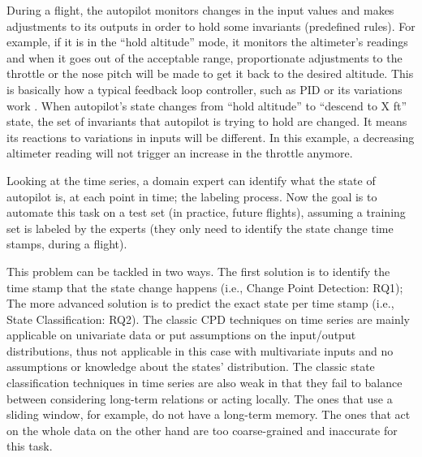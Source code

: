 

During a flight, the autopilot monitors changes in the input values and makes adjustments to its outputs in order to hold some invariants (predefined rules). 
For example, if it is in the ``hold altitude'' mode, it monitors the altimeter's readings and when it goes out of the acceptable range, proportionate adjustments to the throttle or the nose pitch will be made to get it back to the desired altitude. This is basically how a typical feedback loop controller, such as PID or its variations work \cite{feedbacksystemsBook}.
When autopilot's state changes from ``hold altitude'' to ``descend to X ft'' state, the set of invariants that autopilot is trying to hold are changed. It means its reactions to variations in inputs will be different. In this example, a decreasing altimeter reading will not trigger an increase in the throttle anymore.

Looking at the time series, a domain expert can identify what the state of autopilot is, at each point in time; the labeling process. Now the goal is to automate this task on a test set (in practice, future flights), assuming a training set is labeled by the experts (they only need to identify the state change time stamps, during a flight). 

This problem can be tackled in two ways. The first solution is to identify the time stamp that the state change happens (i.e., Change Point Detection: RQ1); The more advanced solution is to predict the exact state per time stamp (i.e., State Classification: RQ2). The classic CPD techniques on time series \cite{Truong2018ChangePointSurvey} are mainly applicable on univariate data or put assumptions on the input/output distributions, thus not applicable in this case with multivariate inputs and no assumptions or knowledge about the states' distribution. The classic state classification techniques in time series are also weak in that %
they fail to balance between considering long-term relations or acting locally. The ones that use a sliding window, for example, do not have a long-term memory. The ones that act on the whole data on the other hand are too coarse-grained and inaccurate for this task.

